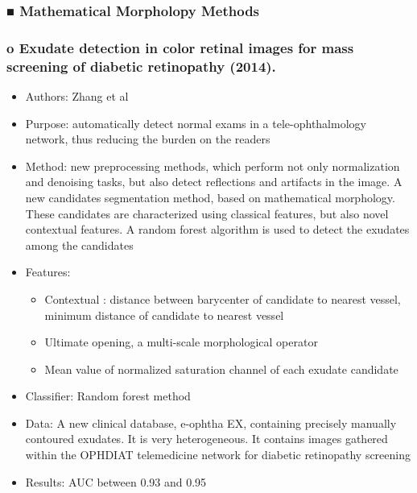 \documentclass[12pt]{report}
\begin{document}
\subsubsection{■ Mathematical Morpholopy Methods}
\subsubsection{o	Exudate detection in color retinal images for mass screening of diabetic retinopathy (2014). \cite{zhang2014exudate}}
\begin{itemize}
\item Authors: Zhang et al
\item Purpose: automatically detect normal exams in a tele-ophthalmology network, thus reducing the burden on the readers
\item Method: new preprocessing methods, which perform not only normalization and denoising tasks, but also detect reflections and artifacts in the image. A new candidates segmentation method, based on mathematical morphology. These candidates are characterized using classical features, but also novel contextual features. A random forest algorithm is used to detect the exudates among the candidates
\item Features:
\begin{itemize}
\item Contextual : distance between barycenter of candidate to nearest vessel, minimum distance of candidate to nearest vessel
\item Ultimate opening, a multi-scale morphological operator
\item Mean value of normalized saturation channel of each exudate candidate
\end{itemize}
\item Classifier: Random forest method
\item Data: A new clinical database, e-ophtha EX, containing precisely manually contoured exudates. It is very heterogeneous. It contains images gathered within the OPHDIAT telemedicine network for diabetic retinopathy screening
\item Results: AUC between 0.93 and 0.95
\end{itemize}
\end{document}
